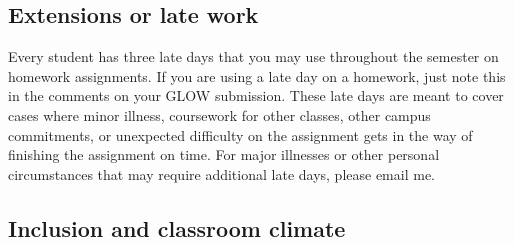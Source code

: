 \documentclass[11pt]{article}
\begin{document}
\subsection{Extensions or late work}

Every student has three late days that you may use throughout the semester on homework assignments. If you are using a late day on a homework, just note this in the comments on your GLOW submission. These late days are meant to cover cases where minor illness, coursework for other classes, other campus commitments, or unexpected difficulty on the assignment gets in the way of finishing the assignment on time. For major illnesses or other personal circumstances that may require additional late days, please email me. 







\subsection{Inclusion and classroom climate}
\end{document}
